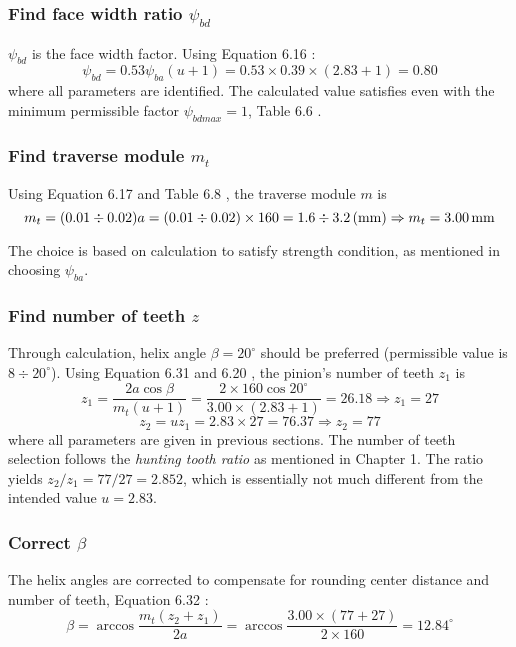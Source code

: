 \subsubsection{Find face width ratio $ \psi_{bd} $}
$ \psi_{bd} $ is the face width factor. Using Equation 6.16 \cite{tk1}:
\[ \psi_{bd} = 0.53\psi_{ba}(u+1) = 0.53\times 0.39\times(2.83+1) = 0.80 \]
where all parameters are identified. The calculated value satisfies even with the minimum permissible factor  $ \psi_{bdmax} = 1 $, Table 6.6 \cite{tk1}.

\subsubsection{Find traverse module $ m_t $}
Using Equation 6.17 and Table 6.8 \cite{tk1}, the traverse module $ m $ is
\[ m_t = (0.01\div0.02)a = (0.01\div0.02)\times 160 =  1.6 \div 3.2 \, (\mathrm{mm}) \Rightarrow m_t=3.00\, \mathrm{mm}\]

The choice is based on calculation to satisfy strength condition, as mentioned in choosing $ \psi_{ba} $.
\subsubsection{Find number of teeth $ z $}
Through calculation, helix angle $ \beta = 20^\circ $ should be preferred (permissible value is $ 8 \div 20^\circ $). Using Equation 6.31 and 6.20 \cite{tk1}, the pinion's number of teeth $ z_1 $ is
\[ z_1 = \dfrac{2a\cos\beta}{m_t(u+1)}= \dfrac{2\times 160\cos 20^\circ}{3.00\times(2.83+1)} = 26.18 \Rightarrow z_1 = 27\]
\[ z_2 = uz_1 = 2.83\times 27 = 76.37 \Rightarrow z_2 = 77\]
where all parameters are given in previous sections. The number of teeth selection follows the \textit{hunting tooth ratio} \cite{Ishibashi1981} as mentioned in Chapter 1. The ratio yields $ z_2/z_1=77/27=2.852 $, which is essentially not much different from the intended value $ u =2.83$. 

\subsubsection{Correct $ \beta $} The helix angles are corrected to compensate for rounding center distance and number of teeth, Equation 6.32 \cite{tk1}:
\[\beta = \arccos\dfrac{m_t(z_2+z_1)}{2a} = \arccos\dfrac{3.00\times(77+27)}{2\times 160} = 12.84 ^\circ\]

